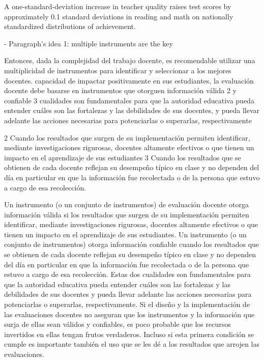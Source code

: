 A one-standard-deviation increase in teacher quality raises test scores by approximately 0.1 standard deviations in reading and math on nationally standardized distributions of achievement. \citep{Rockoff_2004} 



- Paragraph's idea 1: multiple instruments are the key

Entonces, dada la complejidad del trabajo docente, es recomendable utilizar una multiplicidad de instrumentos para identificar y seleccionar a los mejores docentes. capacidad de impactar positivamente en sus estudiantes, la evaluación docente debe basarse en instrumentos que otorguen información válida 2 y confiable 3 cualidades son fundamentales para que la autoridad educativa pueda entender cuáles son las fortalezas y las debilidades de sus docentes, y pueda llevar adelante las acciones necesarias para potenciarlas o superarlas, respectivamente

2 Cuando los resultados que surgen de su implementación permiten identificar, mediante investigaciones rigurosas, docentes altamente efectivos o que tienen un impacto en el aprendizaje de sus estudiantes
3 Cuando los resultados que se obtienen de cada docente reflejan su desempeño típico en clase y no dependen del día en particular en que la información fue recolectada o de la persona que estuvo a cargo de esa recolección. \citep{Bertoni_et_al_2020b}



Un instrumento (o un conjunto de instrumentos) de evaluación docente otorga información válida si los resultados que surgen de su implementación permiten identificar, mediante investigaciones rigurosas, docentes altamente efectivos o que tienen un impacto en el aprendizaje de sus estudiantes. Un instrumento (o un conjunto de instrumentos) otorga información confiable cuando los resultados que se obtienen de cada docente reflejan su desempeño típico en clase y no dependen del día en particular en que la información fue recolectada o de la persona que estuvo a cargo de esa recolección. Estas dos cualidades son fundamentales para que la autoridad educativa pueda entender cuáles son las fortalezas y las debilidades de sus docentes y pueda llevar adelante las acciones necesarias para potenciarlas o superarlas, respectivamente. 
Si el diseño y la implementación de las evaluaciones docentes no aseguran que los instrumentos y la información que surja de ellas sean válidos y confiables, es poco probable que los recursos invertidos en ellas tengan frutos verdaderos. Incluso si esta primera condición se cumple es importante también el uso que se les dé a los resultados que arrojen las evaluaciones. \citep{Hincapie_et_al_2020}


